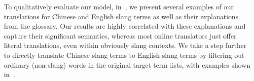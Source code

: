 To qualitatively evaluate our model, in~, 
we present several examples of our translations for Chinese and English slang 
terms as well as their explanations from the glossary.
Our results are highly correlated with these explanations and 
capture their significant semantics, whereas most online translators just offer 
literal translations, even within obviously slang contexts.
We take a step further to directly translate Chinese slang terms to 
English slang terms by filtering out 
ordinary (non-slang) words in the original target term lists, with
examples shown in~. 
